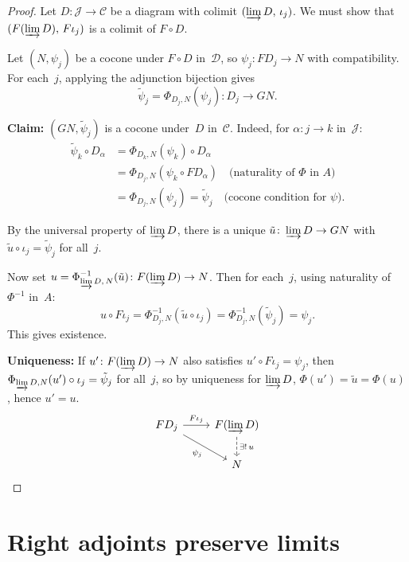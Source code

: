 \begin{proof}
Let $D\colon\mathcal{J}\to\mathcal{C}$ be a diagram with colimit
$(\varinjlim D,\,\iota_j)$.  We must show that
$(F(\varinjlim D),\,F\iota_j)$ is a colimit of $F\circ D$.

Let $(N,\psi_j)$ be a cocone under $F\circ D$ in~$\mathcal{D}$,
so $\psi_j\colon FD_j\to N$ with compatibility.
For each~$j$, applying the adjunction bijection gives
\[
    \tilde\psi_j = \Phi_{D_j,N}(\psi_j) \colon D_j \to GN.
\]

\textbf{Claim:} $(GN,\tilde\psi_j)$ is a cocone under~$D$ in~$\mathcal{C}$.
Indeed, for $\alpha\colon j\to k$ in~$\mathcal{J}$:
\begin{align*}
\tilde\psi_k\circ D_\alpha
&= \Phi_{D_k,N}(\psi_k)\circ D_\alpha \\
&= \Phi_{D_j,N}(\psi_k\circ FD_\alpha)
    \quad\text{(naturality of $\Phi$ in $A$)} \\
&= \Phi_{D_j,N}(\psi_j) = \tilde\psi_j
    \quad\text{(cocone condition for $\psi$)}.
\end{align*}

By the universal property of $\varinjlim D$, there is a unique
$\tilde u\colon\varinjlim D\to GN$ with
$\tilde u\circ\iota_j = \tilde\psi_j$ for all~$j$.

Now set $u = \Phi^{-1}_{\varinjlim D,\,N}(\tilde u)\colon F(\varinjlim D)\to N$.
Then for each~$j$, using naturality of~$\Phi^{-1}$ in~$A$:
\[
    u\circ F\iota_j
    = \Phi^{-1}_{D_j,N}(\tilde u\circ\iota_j)
    = \Phi^{-1}_{D_j,N}(\tilde\psi_j)
    = \psi_j.
\]
This gives existence.

\textbf{Uniqueness:}
If $u'\colon F(\varinjlim D)\to N$ also satisfies
$u'\circ F\iota_j = \psi_j$, then
$\Phi_{\varinjlim D,N}(u')\circ\iota_j = \tilde\psi_j$ for all~$j$,
so by uniqueness for $\varinjlim D$,
$\Phi(u') = \tilde u = \Phi(u)$, hence $u' = u$.
\[
\begin{tikzcd}
FD_j \arrow[r, "F\iota_j"] \arrow[dr, "\psi_j"']
& F(\varinjlim D) \arrow[d, dashed, "\exists!\, u"] \\
& N
\end{tikzcd}
\]
\end{proof}


\section{Right adjoints preserve limits}\label{sec:radj-lim}

